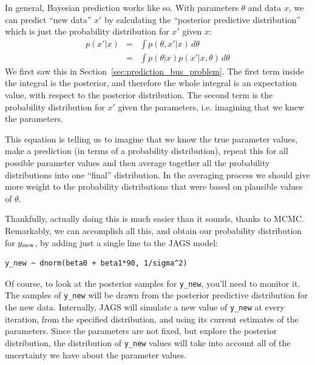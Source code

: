 In general, Bayesian prediction works like so. With parameters
$\theta$ and data $x$, we can predict ``new data'' $x'$ by calculating the
``posterior predictive distribution'' which is just the probability distribution
for $x'$ given $x$:
\begin{eqnarray}
p(x' | x) &=& \int p(\theta, x' | x) \, d\theta\\
&=& \int p(\theta|x) p(x' | x, \theta)\, d\theta
\end{eqnarray}
We first saw this in Section~\ref{sec:prediction_bus_problem}.
The first term inside the integral is the posterior, and therefore the
whole integral is an expectation value, with respect to the posterior distribution.
The second term is
the probability distribution for $x'$ given the parameters, i.e. imagining that
we knew the parameters.

This equation is telling us to imagine that we know the
true parameter values, make a prediction (in terms of a probability distribution),
repeat this for all possible parameter values
and then average together all the probability distributions into one ``final''
distribution. In the averaging process we should give more weight
to the probability distributions that were based on plausible values of $\theta$.

Thankfully, actually doing this is much easier than it sounds, thanks to MCMC.
Remarkably, we can accomplish all this, and obtain our probability distribution
for $y_{\rm new}$, by adding just a single line to the JAGS model:
\begin{verbatim}
y_new ~ dnorm(beta0 + beta1*90, 1/sigma^2)
\end{verbatim}
Of course, to look at the posterior samples for {\tt y\_new}, you'll need to
monitor it. The samples of {\tt y\_new}
will be drawn from the posterior predictive distribution for the new data.
Internally, JAGS will simulate a new value of {\tt y\_new} at every iteration,
from the specified distribution, and using its current estimates of the parameters.
Since the parameters are not fixed, but explore the posterior distribution, the
distribution of {\tt y\_new} values will take into account all of the uncertainty
we have about the parameter values.


